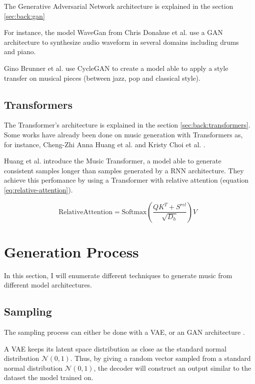 \documentclass[12pt]{report}
\begin{document}
The Generative Adversarial Network architecture is explained in the section \ref{sec:back:gan}

For instance, the model WaveGan from Chris Donahue et al. \cite{donahue_adversarial_2019} use a GAN architecture to synthesize audio waveform in several domains including drums and piano.

Gino Brunner et al. \cite{brunner_symbolic_2018} use CycleGAN \cite{zhu_unpaired_2018} to create a model able to apply a style transfer on musical pieces (between jazz, pop and classical style).

\subsection{Transformers}

The Transformer's architecture is explained in the section \ref{sec:back:transformers}.
Some works have already been done on music generation with Transformers as, for instance, Cheng-Zhi Anna Huang et al. \cite{huang_music_2018} and Kristy Choi et al. \cite{choi_encoding_2019}.

Huang et al. introduce the Music Transformer, a model able to generate consistent samples longer than samples generated by a RNN architecture.
They achieve this perfomance by using a Transformer with relative attention (equation \ref{eq:relative-attention}).

\begin{equation}
    \text{RelativeAttention} = \text{Softmax} (\frac{QK^T + S^{rel}}{\sqrt{D_h}})V
    \label{eq:relative-attention}
\end{equation}

\section{Generation Process}
\label{sec:related-works:generation-process}

In this section, I will enumerate different techniques to generate music from different model architectures.

\subsection{Sampling}

The sampling process can either be done with a VAE, or an GAN architecture \cite{donahue_adversarial_2019}.

A VAE keeps its latent space distribution as close as the standard normal distribution $\mathcal{N}(0, 1)$.
Thus, by giving a random vector sampled from a standard normal distribution $\mathcal{N}(0, 1)$, the decoder will construct an output similar to the dataset the model trained on.
\end{document}
